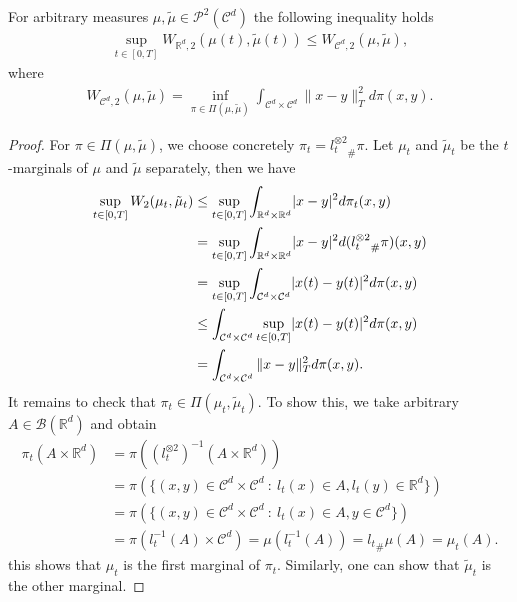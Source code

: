 \begin{prop}\label{c_d_wasserstein}
For arbitrary measures $\mu ,\tilde{\mu } \in  \mathcal{P}^2(\mathcal{C}^{d} ) $ the following inequality holds
\begin{align*}
  \sup_{t \in  [0,T]} W_{\mathbb{R}^{d},2 }(\mu(t),\tilde{\mu }(t) ) \le  W_{\mathcal{C}^{d},2 } (\mu ,\tilde{\mu } )
,\end{align*}
where 
\begin{align*}
  W_{\mathcal{C}^{d},2 }(\mu ,\tilde{\mu } ) = \inf_{\pi  \in  \Pi(\mu ,\tilde{\mu } )} \int_{\mathcal{C}^{d} \times  \mathcal{C}^{d}  } \|x-y \|_T^2 d\pi(x,y)
.\end{align*}
\end{prop}

\begin{proof} For $\pi  \in  \Pi(\mu ,\tilde{\mu } )$, we choose concretely $\pi_t =  {l_t^{\otimes 2}}_\# \pi $. Let $\mu_t$ and $\tilde\mu_t$ be the $t$-marginals of $\mu$ and $\tilde \mu$ separately, then we have
  \begin{align*}
    \sup_{t \in  [0,T]} W_2(\mu_t,\tilde{\mu }_t ) &\le \sup_{t \in  [0,T]} \int_{\mathbb{R}^{d} \times  \mathbb{R}^{d} } \lvert x-y\rvert^2 d \pi_t(x,y)\\
                                                 &= \sup_{t \in  [0,T]} \int_{\mathbb{R}^{d} \times  \mathbb{R}^{d} } \lvert x-y\rvert^2 d ({l_t^{\otimes 2}}_\# \pi)(x,y)\\
                                                 &= \sup_{t \in  [0,T]} \int_{\mathcal{C}^{d} \times \mathcal{C}^{d}   } \lvert x(t)-y(t)\rvert^2 d\pi(x,y)\\
                                                 &\le  \int_{\mathcal{C}^{d} \times  \mathcal{C}^{d}  } \sup_{t \in  [0,T]} \lvert x(t)-y(t)\rvert^2 d\pi(x,y) \\
                                                 &= \int_{\mathcal{C}^{d} \times  \mathcal{C}^{d}  } \|x-y\|_T^2 d\pi(x,y)
  .\end{align*}
  It remains to check that $\pi_t \in  \Pi(\mu_t,\tilde{\mu}_t )$. To show this, we take arbitrary $A \in  \mathcal{B}(\mathbb{R}^{d} )$ and obtain
  \begin{align*}
    \pi_t(A \times  \mathbb{R}^{d} ) &= \pi ((l_t^{\otimes 2})^{-1}(A \times  \mathbb{R}^{d} )) \\
                                     &= \pi(\{(x,y) \in  \mathcal{C}^{d} \times  \mathcal{C}^{d} \ : \ l_t(x) \in  A, l_t(y) \in  \mathbb{R}^{d}   \}  )\\
                                     &=\pi (\{(x,y) \in  \mathcal{C}^{d} \times  \mathcal{C}^{d} \ : \ l_t(x) \in  A  , y \in  \mathcal{C}^{d}  \}  ) \\
                                     &= \pi(l_t^{-1}(A) \times \mathcal{C}^{d} )= \mu(l_t^{-1}(A)) = {l_t}_\# \mu(A)= \mu_t(A)
  .\end{align*}
  this shows that $\mu_t$ is the first marginal of $\pi_t$. Similarly, one can show that $\tilde\mu_t$ is the other marginal.
\end{proof}
